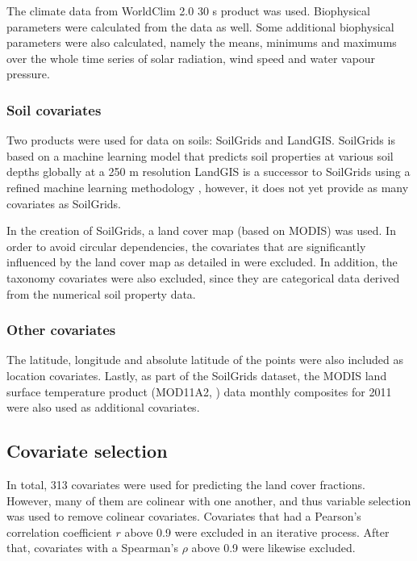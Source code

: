 \documentclass[a4paper,10pt]{article}
\begin{document}
The climate data from WorldClim 2.0 30 s product \citep{worldclim2} was used.
Biophysical parameters were calculated from the data as well.
Some additional biophysical parameters were also calculated, namely the means, minimums and maximums over the whole time series of solar radiation, wind speed and water vapour pressure.

\subsubsection{Soil covariates}

Two products were used for data on soils: SoilGrids and LandGIS.
SoilGrids is based on a machine learning model that predicts soil properties at various soil depths globally at a 250 m resolution \citep{hengl_soilgrids250m_2017}
LandGIS is a successor to SoilGrids using a refined machine learning methodology \citep{hengl_predictive_2019}, however, it does not yet provide as many covariates as SoilGrids.

In the creation of SoilGrids, a land cover map (based on MODIS) was used.
In order to avoid circular dependencies, the covariates that are significantly influenced by the land cover map as detailed in \citet{hengl_soilgrids250m_2017} were excluded.
In addition, the taxonomy covariates were also excluded, since they are categorical data derived from the numerical soil property data.

\subsubsection{Other covariates}

The latitude, longitude and absolute latitude of the points were also included as location covariates.
Lastly, as part of the SoilGrids dataset, the MODIS land surface temperature product (MOD11A2, \citealp{wan_mod11a2_2015}) data monthly composites for 2011 were also used as additional covariates.

\subsection{Covariate selection}

In total, 313 covariates were used for predicting the land cover fractions.
However, many of them are colinear with one another, and thus variable selection was used to remove colinear covariates.
Covariates that had a Pearson's correlation coefficient $r$ above 0.9 were excluded in an iterative process.
After that, covariates with a Spearman's $\rho$ above 0.9 were likewise excluded.
\end{document}
